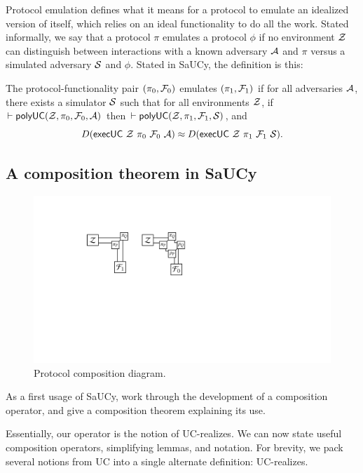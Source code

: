 Protocol emulation defines what it means for a protocol to emulate an idealized
version of itself, which relies on an ideal functionality to do all the
work. Stated informally, we say that a protocol $\pi$ emulates a protocol $\phi$ if no
environment $\mathcal{{Z}}$ can distinguish between interactions with a known adversary
$\mathcal{{A}}$ and $\pi$ versus a simulated adversary $\mathcal{{S}}$ and $\phi$. Stated in SaUCy,
the definition is this:
\begin{definition}[Emulation]
  The protocol-functionality pair $(\pi_0, \mathcal{{F}}_0)$ emulates $(\pi_1, \mathcal{{F}}_1)$
  if for all adversaries $\mathcal{{A}}$, there exists a simulator $\mathcal{{S}}$
  such that for all environments $\mathcal{{Z}}$, if $|- \text{\textsf{polyUC}}(\mathcal{{Z}}, \pi_0,
  \mathcal{{F}}_0, \mathcal{{A}})$ then $|- \text{\textsf{polyUC}}(\mathcal{{Z}}, \pi_1, \mathcal{{F}}_1, \mathcal{{S}})$,
  and
  \[ D(\mathsf{execUC}\ \mc{Z}\ \pi_0\ \mc{F}_0\ \mc{A}) \approx D(\mathsf{execUC}\ \mc{Z}\ \pi_1\ \mc{F}_1\ \mc{S}).\]
\end{definition}

\subsection{A composition theorem in SaUCy}
\label{subsec:composition}

\begin{figure}
  \centering
  \includegraphics[width=0.85\linewidth]{graphics/protocol-composition}
  \caption{Protocol composition diagram.}
  \label{fig:protocol-composition}
\end{figure}

As a first usage of SaUCy, work through the development of a composition
operator, and give a composition theorem explaining its use.


Essentially, our operator is the notion of UC-realizes. We can now state useful
composition operators, simplifying lemmas, and notation. For brevity, we pack
several notions from UC into a single alternate definition: UC-realizes.

